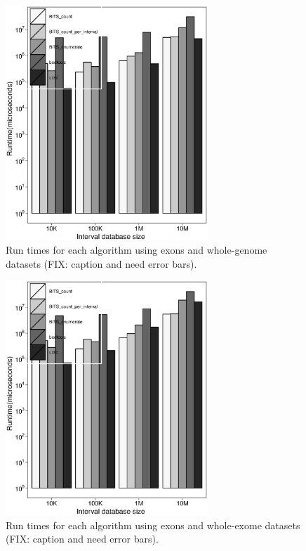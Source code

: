 \documentclass{bioinfo}
\begin{document}
		\begin{figure}[h]
			\centering
			\includegraphics[width=3in]{figures/exons-v-genome.eps}
			\caption[]{Run times for each algorithm using exons and whole-genome datasets (FIX: caption and need error bars).}
		\end{figure}
		
		\begin{figure}[h]
			\centering
			\includegraphics[width=3in]{figures/exons-v-exome.eps}
			\caption[]{Run times for each algorithm using exons and whole-exome datasets (FIX: caption and need error bars).}
		\end{figure}



\end{document}
